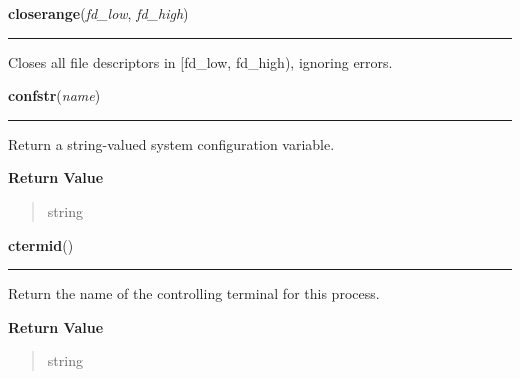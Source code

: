     \vspace{0.5ex}

\hspace{.8\funcindent}\begin{boxedminipage}{\funcwidth}

    \raggedright \textbf{closerange}(\textit{fd\_low}, \textit{fd\_high})

    \vspace{-1.5ex}

    \rule{\textwidth}{0.5\fboxrule}
\setlength{\parskip}{2ex}
    Closes all file descriptors in [fd\_low, fd\_high), ignoring errors.

\setlength{\parskip}{1ex}
    \end{boxedminipage}

    \label{os:confstr}

    \vspace{0.5ex}

\hspace{.8\funcindent}\begin{boxedminipage}{\funcwidth}

    \raggedright \textbf{confstr}(\textit{name})

    \vspace{-1.5ex}

    \rule{\textwidth}{0.5\fboxrule}
\setlength{\parskip}{2ex}
    Return a string-valued system configuration variable.

\setlength{\parskip}{1ex}
      \textbf{Return Value}
    \vspace{-1ex}

      \begin{quote}
      string

      \end{quote}

    \end{boxedminipage}

    \label{os:ctermid}

    \vspace{0.5ex}

\hspace{.8\funcindent}\begin{boxedminipage}{\funcwidth}

    \raggedright \textbf{ctermid}()

    \vspace{-1.5ex}

    \rule{\textwidth}{0.5\fboxrule}
\setlength{\parskip}{2ex}
    Return the name of the controlling terminal for this process.

\setlength{\parskip}{1ex}
      \textbf{Return Value}
    \vspace{-1ex}

      \begin{quote}
      string

      \end{quote}

    \end{boxedminipage}

